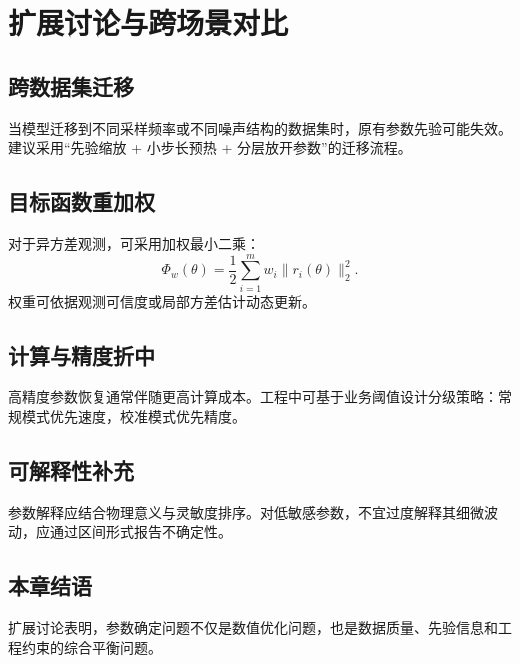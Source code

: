 \chapter{扩展讨论与跨场景对比}

\section{跨数据集迁移}
当模型迁移到不同采样频率或不同噪声结构的数据集时，原有参数先验可能失效。建议采用“先验缩放 + 小步长预热 + 分层放开参数”的迁移流程。

\section{目标函数重加权}
对于异方差观测，可采用加权最小二乘：
\[
\Phi_w(\theta)=\frac{1}{2}\sum_{i=1}^m w_i\|r_i(\theta)\|_2^2.
\]
权重可依据观测可信度或局部方差估计动态更新。

\section{计算与精度折中}
高精度参数恢复通常伴随更高计算成本。工程中可基于业务阈值设计分级策略：常规模式优先速度，校准模式优先精度。

\section{可解释性补充}
参数解释应结合物理意义与灵敏度排序。对低敏感参数，不宜过度解释其细微波动，应通过区间形式报告不确定性。

\section{本章结语}
扩展讨论表明，参数确定问题不仅是数值优化问题，也是数据质量、先验信息和工程约束的综合平衡问题。
